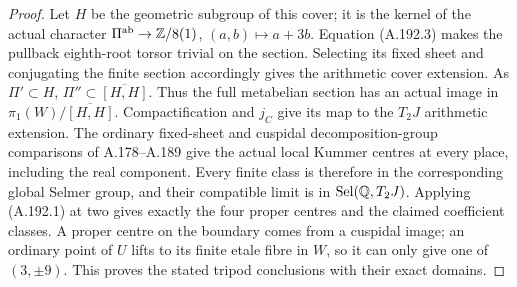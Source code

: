 \begin{proof}
Let \(H\) be the geometric subgroup of this
cover; it is the kernel of the actual character
\(\Pi^{\rm ab}\to\mathbb Z/8(1)\),
\((a,b)\mapsto a+3b\).
Equation (A.192.3) makes the pullback eighth-root
torsor trivial on the section.  Selecting its
fixed sheet and conjugating the finite section
accordingly gives the arithmetic cover extension.
As \(\Pi'\subset H\),
\(\Pi''\subset\overline{[H,H]}\).
Thus the full metabelian section has an actual
image in \(\pi_1(W)/\overline{[H,H]}\).
Compactification and \(j_C\) give its map to
the \(T_2J\) arithmetic extension.
The ordinary fixed-sheet and cuspidal
decomposition-group comparisons of A.178--A.189
give the actual local Kummer centres at every
place, including the real component.  Every
finite class is therefore in the corresponding
global Selmer group, and their compatible
limit is in \(\operatorname{Sel}(\mathbb Q,T_2J)\).
Applying (A.192.1) at two gives exactly the
four proper centres and the claimed coefficient
classes.  A proper centre on the boundary
comes from a cuspidal image; an ordinary
point of \(U\) lifts to its finite etale
fibre in \(W\), so it can only give one
of \((3,\pm9)\).  This proves the stated
tripod conclusions with their exact domains.
\end{proof}
